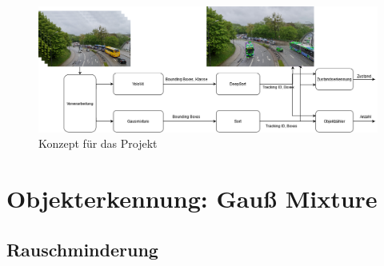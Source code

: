 \documentclass[conference]{IEEEtran}
\begin{document}
	\begin{figure}[!h]
		\begin{center}
			\includegraphics[width=14cm]{Media/KonzeptVAOT.png}
			\caption{Konzept für das Projekt}
			\label{Konzept}
		\end{center}
	\end{figure}
	

	
	
	\section{Objekterkennung: Gauß Mixture}
	
	\subsection{Rauschminderung}
	
\end{document}
